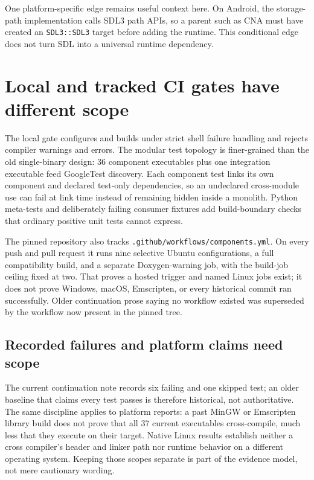 One platform-specific edge remains useful context here. On Android, the storage-path
implementation calls SDL3 path APIs, so a parent such as CNA must have created an
\texttt{SDL3::SDL3} target before adding the runtime. This conditional edge does not turn SDL
into a universal runtime dependency.

\section{Local and tracked CI gates have different scope}

The local gate configures and builds under strict shell failure handling and rejects compiler
warnings and errors. The modular test topology is finer-grained than the old
single-binary design: 36 component executables plus one integration executable feed GoogleTest
discovery. Each component test links its own component and declared test-only dependencies,
so an undeclared cross-module use can fail at link time instead of remaining hidden inside a
monolith. Python meta-tests and deliberately failing consumer fixtures add build-boundary
checks that ordinary positive unit tests cannot express.

The pinned repository also tracks \texttt{.github/workflows/components.yml}. On every push and
pull request it runs nine selective Ubuntu configurations, a full compatibility build, and a
separate Doxygen-warning job, with the build-job ceiling fixed at two. That proves a hosted
trigger and named Linux jobs exist; it does not prove Windows, macOS, Emscripten, or every
historical commit ran successfully. Older continuation prose saying no workflow existed was
superseded by the workflow now present in the pinned tree.

\subsection{Recorded failures and platform claims need scope}

The current continuation note records six failing and one skipped test; an older baseline that
claims every test passes is therefore historical, not authoritative. The same discipline
applies to platform reports: a past MinGW or Emscripten library build does not prove that all
37 current executables cross-compile, much less that they execute on their target. Native Linux
results establish neither a cross compiler's header and linker path nor runtime behavior on a
different operating system. Keeping those scopes separate is part of the evidence model, not
mere cautionary wording.
